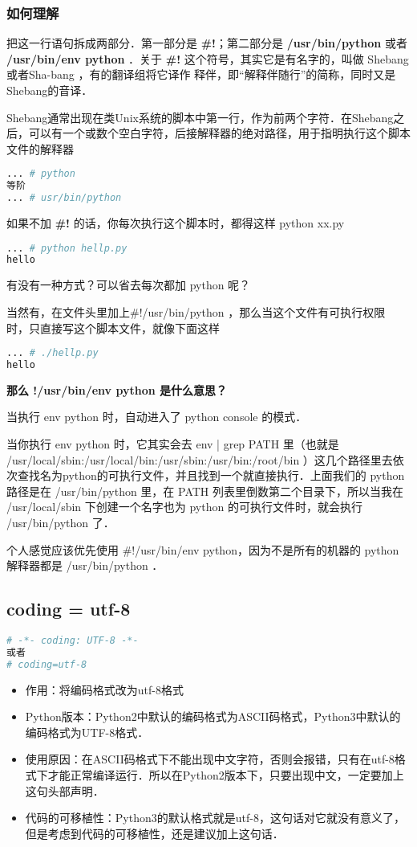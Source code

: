 \subsubsection{如何理解}
把这一行语句拆成两部分．第一部分是 \textbf{#!}；第二部分是 \textbf{/usr/bin/python} 或者 \textbf{/usr/bin/env python} ．关于 \textbf{#!} 这个符号，其实它是有名字的，叫做 Shebang 或者Sha-bang ，有的翻译组将它译作 释伴，即“解释伴随行”的简称，同时又是Shebang的音译．

Shebang通常出现在类Unix系统的脚本中第一行，作为前两个字符．在Shebang之后，可以有一个或数个空白字符，后接解释器的绝对路径，用于指明执行这个脚本文件的解释器
\begin{lstlisting}[language=bash]
... # python
等阶
... # usr/bin/python
\end{lstlisting}

如果不加 \textbf{#!} 的话，你每次执行这个脚本时，都得这样 python xx.py
\begin{lstlisting}[language=bash]
... # python hellp.py
hello
\end{lstlisting}

有没有一种方式？可以省去每次都加 python 呢？

当然有，在文件头里加上#!/usr/bin/python ，那么当这个文件有可执行权限 时，只直接写这个脚本文件，就像下面这样
\begin{lstlisting}[language=bash]
... # ./hellp.py
hello
\end{lstlisting}

\textbf{那么 !/usr/bin/env python 是什么意思？}

当执行 env python 时，自动进入了 python console 的模式．

当你执行 env python 时，它其实会去 env | grep PATH 里（也就是 /usr/local/sbin:/usr/local/bin:/usr/sbin:/usr/bin:/root/bin ）这几个路径里去依次查找名为python的可执行文件，并且找到一个就直接执行．上面我们的 python 路径是在 /usr/bin/python 里，在 PATH 列表里倒数第二个目录下，所以当我在 /usr/local/sbin 下创建一个名字也为 python 的可执行文件时，就会执行 /usr/bin/python 了．

个人感觉应该优先使用 #!/usr/bin/env python，因为不是所有的机器的 python 解释器都是 /usr/bin/python ．

\subsection{coding = utf-8 }
\begin{lstlisting}[language=python]
# -*- coding: UTF-8 -*-
或者
# coding=utf-8
\end{lstlisting}
\begin{itemize}
\item 作用：将编码格式改为utf-8格式
\item Python版本：Python2中默认的编码格式为ASCII码格式，Python3中默认的编码格式为UTF-8格式．
\item 使用原因：在ASCII码格式下不能出现中文字符，否则会报错，只有在utf-8格式下才能正常编译运行．所以在Python2版本下，只要出现中文，一定要加上这句头部声明．
\item 代码的可移植性：Python3的默认格式就是utf-8，这句话对它就没有意义了，但是考虑到代码的可移植性，还是建议加上这句话．
\end{itemize}

